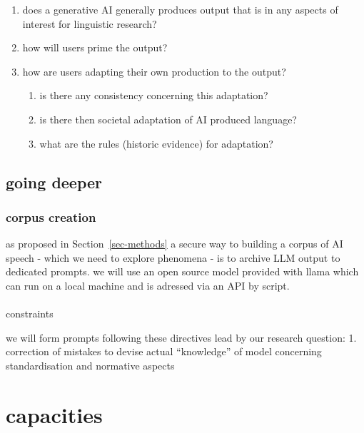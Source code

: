 \documentclass[
  letterpaper,
  DIV=11,
  numbers=noendperiod]{scrartcl}
\makeatletter
\let\oldparagraph\paragraph
\renewcommand{\paragraph}{
    \@ifstar
      \xxxParagraphStar
      \xxxParagraphNoStar
  }
\newcommand{\xxxParagraphStar}[1]{\oldparagraph*{#1}\mbox{}}
\newcommand{\xxxParagraphNoStar}[1]{\oldparagraph{#1}\mbox{}}
\providecommand{\tightlist}{%
  \setlength{\itemsep}{0pt}\setlength{\parskip}{0pt}}
\makeatother
\begin{document}
\begin{enumerate}
\def\labelenumi{\arabic{enumi}.}
\tightlist
\item
  does a generative AI generally produces output that is in any aspects
  of interest for linguistic research?
\item
  how will users prime the output?
\item
  how are users adapting their own production to the output?

  \begin{enumerate}
  \def\labelenumii{\arabic{enumii}.}
  \tightlist
  \item
    is there any consistency concerning this adaptation?
  \item
    is there then societal adaptation of AI produced language?
  \item
    what are the rules (historic evidence) for adaptation?
  \end{enumerate}
\end{enumerate}

\subsection{going deeper}\label{going-deeper}

\subsubsection{corpus creation}\label{corpus-creation}

as proposed in Section~\ref{sec-methods} a secure way to building a
corpus of AI speech - which we need to explore phenomena - is to archive
LLM output to dedicated prompts. we will use an open source model
provided with llama which can run on a local machine and is adressed via
an API by script.

\paragraph{constraints}\label{constraints}

we will form prompts following these directives lead by our research
question: 1. correction of mistakes to devise actual ``knowledge'' of
model concerning standardisation and normative aspects

\section{capacities}\label{capacities}
\end{document}
